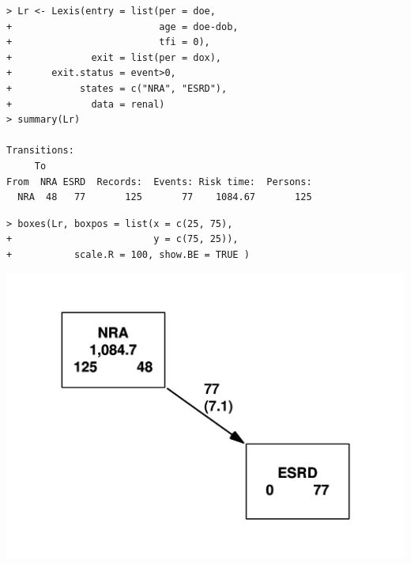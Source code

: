 \begin{frame}[fragile]
\renewcommand{\baselinestretch}{0.8}
\footnotesize
\begin{verbatim}
> Lr <- Lexis(entry = list(per = doe,
+                          age = doe-dob,
+                          tfi = 0),
+              exit = list(per = dox),
+       exit.status = event>0,
+            states = c("NRA", "ESRD"),
+              data = renal)
> summary(Lr)

Transitions:
     To
From  NRA ESRD  Records:  Events: Risk time:  Persons:
  NRA  48   77       125       77    1084.67       125
\end{verbatim}
\normalsize
\renewcommand{\baselinestretch}{1.0}
\end{frame}

\begin{frame}[fragile]
\renewcommand{\baselinestretch}{0.8}
\footnotesize
\begin{verbatim}
> boxes(Lr, boxpos = list(x = c(25, 75),
+                         y = c(75, 25)),
+           scale.R = 100, show.BE = TRUE )
\end{verbatim}
\normalsize
\renewcommand{\baselinestretch}{1.0}
\begin{center}
\includegraphics[height=0.7\textheight,keepaspectratio]{./NRA-mort}
\end{center}
\end{frame}

